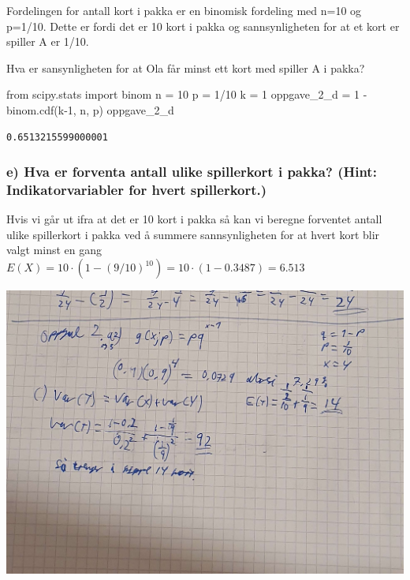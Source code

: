 \documentclass[
  12pt,
  a4paper,
  DIV=11,
  numbers=noendperiod]{scrartcl}
\newenvironment{Shaded}{\begin{snugshade}}{\end{snugshade}}
\newcommand{\DecValTok}[1]{\textcolor[rgb]{0.68,0.00,0.00}{#1}}
\newcommand{\ImportTok}[1]{\textcolor[rgb]{0.00,0.46,0.62}{#1}}
\newcommand{\NormalTok}[1]{\textcolor[rgb]{0.00,0.23,0.31}{#1}}
\newcommand{\OperatorTok}[1]{\textcolor[rgb]{0.37,0.37,0.37}{#1}}
\begin{document}
Fordelingen for antall kort i pakka er en binomisk fordeling med n=10 og
p=1/10. Dette er fordi det er 10 kort i pakka og sannsynligheten for at
et kort er spiller A er 1/10.

Hva er sansynligheten for at Ola får minst ett kort med spiller A i
pakka?

\begin{Shaded}
\begin{Highlighting}[]
\ImportTok{from}\NormalTok{ scipy.stats }\ImportTok{import}\NormalTok{ binom}
\NormalTok{n }\OperatorTok{=} \DecValTok{10}
\NormalTok{p }\OperatorTok{=} \DecValTok{1}\OperatorTok{/}\DecValTok{10}
\NormalTok{k }\OperatorTok{=} \DecValTok{1}
\NormalTok{oppgave\_2\_d }\OperatorTok{=} \DecValTok{1} \OperatorTok{{-}}\NormalTok{ binom.cdf(k}\OperatorTok{{-}}\DecValTok{1}\NormalTok{, n, p)}
\NormalTok{oppgave\_2\_d}
\end{Highlighting}
\end{Shaded}

\begin{verbatim}
0.6513215599000001
\end{verbatim}

\subsubsection{e) Hva er forventa antall ulike spillerkort i pakka?
(Hint: Indikatorvariabler for hvert
spillerkort.)}\label{e-hva-er-forventa-antall-ulike-spillerkort-i-pakka-hint-indikatorvariabler-for-hvert-spillerkort.}

Hvis vi går ut ifra at det er 10 kort i pakka så kan vi beregne
forventet antall ulike spillerkort i pakka ved å summere sannsynligheten
for at hvert kort blir valgt minst en gang
\(E(X) = 10 \cdot (1 - (9/10)^{10}) = 10 \cdot (1 - 0.3487) = 6.513\)

\clearpage

\includegraphics{oblig2_utregning/oppgave2.jpg} \clearpage
\end{document}
